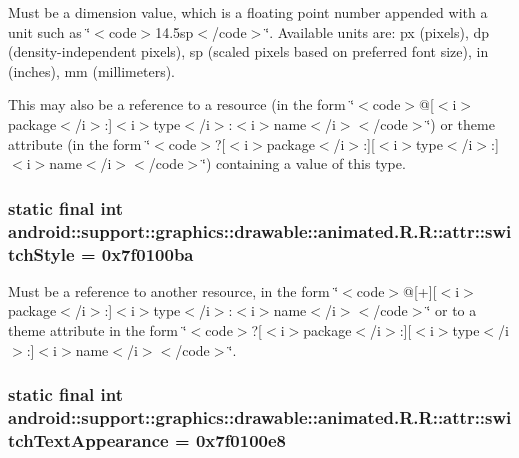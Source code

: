 Must be a dimension value, which is a floating point number appended with a unit such as \char`\"{}$<$code$>$14.5sp$<$/code$>$\char`\"{}. Available units are: px (pixels), dp (density-independent pixels), sp (scaled pixels based on preferred font size), in (inches), mm (millimeters). 

This may also be a reference to a resource (in the form \char`\"{}$<$code$>$@\mbox{[}$<$i$>$package$<$/i$>$:\mbox{]}$<$i$>$type$<$/i$>$:$<$i$>$name$<$/i$>$$<$/code$>$\char`\"{}) or theme attribute (in the form \char`\"{}$<$code$>$?\mbox{[}$<$i$>$package$<$/i$>$:\mbox{]}\mbox{[}$<$i$>$type$<$/i$>$:\mbox{]}$<$i$>$name$<$/i$>$$<$/code$>$\char`\"{}) containing a value of this type. \hypertarget{classandroid_1_1support_1_1graphics_1_1drawable_1_1animated_1_1_r_1_1attr_db5e8b58645d27cef66a096719f4f8b6}{
\subsubsection[{switchStyle}]{\setlength{\rightskip}{0pt plus 5cm}static final int android::support::graphics::drawable::animated.R.R::attr::switchStyle = 0x7f0100ba}}
\label{classandroid_1_1support_1_1graphics_1_1drawable_1_1animated_1_1_r_1_1attr_db5e8b58645d27cef66a096719f4f8b6}


Must be a reference to another resource, in the form \char`\"{}$<$code$>$@\mbox{[}+\mbox{]}\mbox{[}$<$i$>$package$<$/i$>$:\mbox{]}$<$i$>$type$<$/i$>$:$<$i$>$name$<$/i$>$$<$/code$>$\char`\"{} or to a theme attribute in the form \char`\"{}$<$code$>$?\mbox{[}$<$i$>$package$<$/i$>$:\mbox{]}\mbox{[}$<$i$>$type$<$/i$>$:\mbox{]}$<$i$>$name$<$/i$>$$<$/code$>$\char`\"{}. \hypertarget{classandroid_1_1support_1_1graphics_1_1drawable_1_1animated_1_1_r_1_1attr_4caa3232d1cd3c4cec06f534d1fd2157}{
\subsubsection[{switchTextAppearance}]{\setlength{\rightskip}{0pt plus 5cm}static final int android::support::graphics::drawable::animated.R.R::attr::switchTextAppearance = 0x7f0100e8}}
\label{classandroid_1_1support_1_1graphics_1_1drawable_1_1animated_1_1_r_1_1attr_4caa3232d1cd3c4cec06f534d1fd2157}


